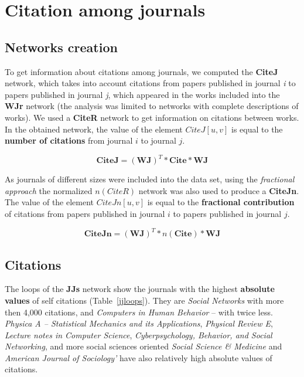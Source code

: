 \documentclass[11pt]{article} %
\begin{document}
\section{Citation among journals}

\subsection{Networks creation}

To get information about citations among journals, we computed the \textbf{CiteJ} network, which takes into account citations from papers published in journal \textit{i} to papers published in journal \textit{j}, which appeared in the works included into the \textbf{WJr} network (the analysis was limited to networks with complete descriptions of works). We used a \textbf{CiteR} network to get information on citations between works. In the obtained network, the value of the element $CiteJ[u,v]$ is equal to the \textbf{number of citations} from journal $i$ to journal $j$. \smallskip

\[ \mathbf{CiteJ} = (\mathbf{WJ}) ^ T * \mathbf{Cite} * \mathbf{WJ} \] 

As journals of different sizes were included into the data set, using the \textit{fractional approach} the normalized  $n(CiteR)$ network was also used to produce a \textbf{CiteJn}. The value of the element $CiteJn[u,v]$ is equal to the \textbf{fractional contribution} of citations from papers published in journal $i$ to papers published in journal $j$. \medskip 

\[ \mathbf{CiteJn} = (\mathbf{WJ}) ^ T * n(\mathbf{Cite}) * \mathbf{WJ} \]  
 

\subsection{Citations}

The loops of the \textbf{JJs} network show the journals with the highest \textbf{absolute values} of self citations (Table~\ref{jjloops}). They are \textit{Social Networks} with more then 4,000 citations, and \textit{Computers in Human Behavior} -- with twice less. \textit{Physica A -- Statistical Mechanics and its Applications}, \textit{Physical Review E}, \textit{Lecture notes in Computer Science}, \textit{Cyberpsychology, Behavior, and Social Networking}, and more social sciences oriented \textit{Social Science \& Medicine} and \textit{American Journal of Sociology'} have also relatively high absolute values of citations. \medskip 
\end{document}
